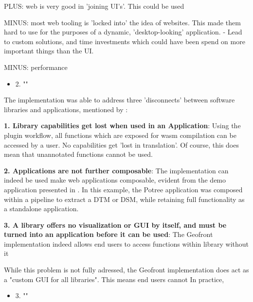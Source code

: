 PLUS: web is very good in 'joining UI's'. This could be used 

MINUS: most web tooling is 'locked into' the idea of websites. This made them hard to use for the purposes of a dynamic,
'desktop-looking' application.
- Lead to custom solutions, and time investments which could have been spend on more important things than the UI.

MINUS: performance


\begin{itemize}[ ]
  \item 2. "\myNewSubRQTwo"
\end{itemize}

The implementation was able to address three 'disconnects' between software libraries and applications, mentioned by \citet*{elliott_tangible_2007}: 

\textbf{1. Library capabilities get lost when used in an Application}:
Using the plugin workflow, all functions which are exposed for wasm compilation can be accessed by a user. No capabilities get 'lost in translation'.
Of course, this does mean that unannotated functions cannot be used. 

\textbf{2. Applications are not further composable}:
The implementation can indeed be used make web applications composable, evident from the demo application presented in .
In this example, the Potree application was composed within a pipeline to extract a DTM or DSM, while retaining full functionality as a standalone application.

\textbf{3. A library offers no visualization or GUI by itself, and must be turned into an application before it can be used}:
The Geofront implementation indeed allows end users to access functions within library without it 

While this problem is not fully adressed, the Geofront implementation does act as a "custom GUI for all libraries". 
This means end users cannot 
In practice, 

\begin{itemize}[ ]
  \item 3. "\myNewSubRQThree"
\end{itemize}


